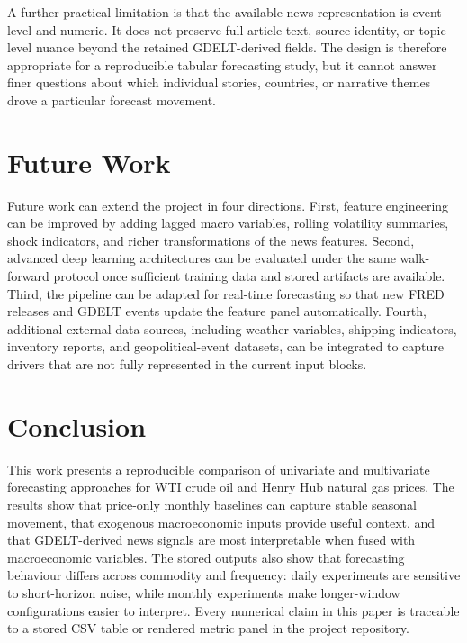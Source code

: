 \documentclass[11pt,a4paper]{article}
\begin{document}
A further practical limitation is that the available news representation is event-level and numeric. It does not preserve full article text, source identity, or topic-level nuance beyond the retained GDELT-derived fields. The design is therefore appropriate for a reproducible tabular forecasting study, but it cannot answer finer questions about which individual stories, countries, or narrative themes drove a particular forecast movement.

\section{Future Work}\label{sec:future-work}

Future work can extend the project in four directions. First, feature engineering can be improved by adding lagged macro variables, rolling volatility summaries, shock indicators, and richer transformations of the news features. Second, advanced deep learning architectures can be evaluated under the same walk-forward protocol once sufficient training data and stored artifacts are available. Third, the pipeline can be adapted for real-time forecasting so that new FRED releases and GDELT events update the feature panel automatically. Fourth, additional external data sources, including weather variables, shipping indicators, inventory reports, and geopolitical-event datasets, can be integrated to capture drivers that are not fully represented in the current input blocks.

\section{Conclusion}\label{sec:conclusion}

This work presents a reproducible comparison of univariate and multivariate forecasting approaches for WTI crude oil and Henry Hub natural gas prices. The results show that price-only monthly baselines can capture stable seasonal movement, that exogenous macroeconomic inputs provide useful context, and that GDELT-derived news signals are most interpretable when fused with macroeconomic variables. The stored outputs also show that forecasting behaviour differs across commodity and frequency: daily experiments are sensitive to short-horizon noise, while monthly experiments make longer-window configurations easier to interpret. Every numerical claim in this paper is traceable to a stored CSV table or rendered metric panel in the project repository.
\end{document}
